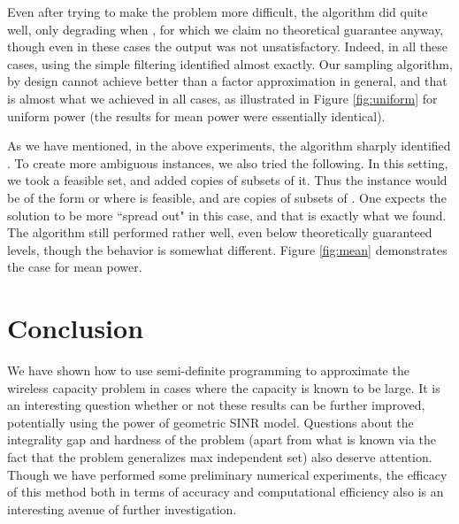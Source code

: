 \documentclass[11pt]{amsart}
\begin{document}
Even after trying to make the problem more difficult, the algorithm did quite well, only degrading when , for which we claim no theoretical guarantee anyway, though even in these cases the output was not unsatisfactory. Indeed,
in all these cases, using the simple filtering  identified  almost exactly. Our sampling algorithm, by design cannot achieve better than a factor  approximation in general, and that is almost what we achieved in all cases, as illustrated in Figure \ref{fig:uniform} for uniform power (the results for mean power were essentially identical).

As we have mentioned, in the above experiments, the algorithm sharply identified . To create more
ambiguous instances, we also tried the following. In this setting, we took a feasible set, and added copies of subsets of
it. Thus the instance would be of the form  or  where  is feasible, and
 are copies of subsets of . One expects the solution to be more ``spread out" in this case, and that is exactly what we found.
The algorithm still performed rather well, even below theoretically guaranteed levels, though the behavior is somewhat different. Figure \ref{fig:mean} demonstrates the case for mean power.




\section{Conclusion}
We have shown how to use semi-definite programming to approximate the wireless capacity problem in cases where the capacity is known to be large. It is an interesting question whether or not these results can be further improved, potentially using the power of geometric SINR model. Questions about the integrality gap and hardness of the problem (apart from what is known via the fact that the problem generalizes max independent set) also deserve attention. Though we have performed some preliminary numerical experiments, the efficacy of this method both in terms of accuracy and computational efficiency also is an interesting avenue of further investigation.


		
\end{document}
